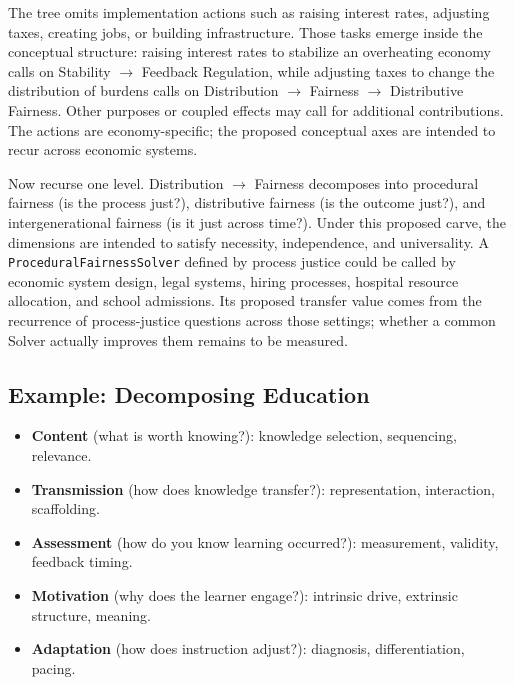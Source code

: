 \documentclass[11pt]{article}
\let\oldtexttt\texttt
\renewcommand{\texttt}[1]{\oldtexttt{\small #1}}
\begin{document}
The tree omits implementation actions such as raising interest rates, adjusting taxes, creating jobs, or building infrastructure. Those tasks emerge inside the conceptual structure: raising interest rates to stabilize an overheating economy calls on Stability $\to$ Feedback Regulation, while adjusting taxes to change the distribution of burdens calls on Distribution $\to$ Fairness $\to$ Distributive Fairness. Other purposes or coupled effects may call for additional contributions. The actions are economy-specific; the proposed conceptual axes are intended to recur across economic systems.

Now recurse one level. Distribution $\to$ Fairness decomposes into procedural fairness (is the process just?), distributive fairness (is the outcome just?), and intergenerational fairness (is it just across time?). Under this proposed carve, the dimensions are intended to satisfy necessity, independence, and universality. A \texttt{ProceduralFairnessSolver} defined by process justice could be called by economic system design, legal systems, hiring processes, hospital resource allocation, and school admissions. Its proposed transfer value comes from the recurrence of process-justice questions across those settings; whether a common Solver actually improves them remains to be measured.

\subsection{Example: Decomposing Education}

\begin{itemize}[leftmargin=1.5em]
\item \textbf{Content} (what is worth knowing?): knowledge selection, sequencing, relevance.
\item \textbf{Transmission} (how does knowledge transfer?): representation, interaction, scaffolding.
\item \textbf{Assessment} (how do you know learning occurred?): measurement, validity, feedback timing.
\item \textbf{Motivation} (why does the learner engage?): intrinsic drive, extrinsic structure, meaning.
\item \textbf{Adaptation} (how does instruction adjust?): diagnosis, differentiation, pacing.
\end{itemize}
\end{document}
